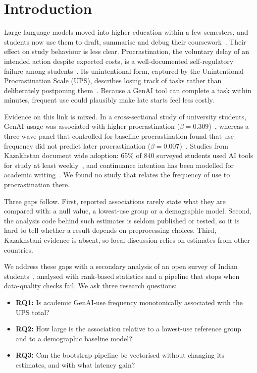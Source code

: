 \section{Introduction}

Large language models moved into higher education within a few semesters, and students now use them to draft, summarise and debug their coursework~\cite{kasneci2023chatgpt}. Their effect on study behaviour is less clear. Procrastination, the voluntary delay of an intended action despite expected costs, is a well-documented self-regulatory failure among students~\cite{steel2007nature}. Its unintentional form, captured by the Unintentional Procrastination Scale (UPS), describes losing track of tasks rather than deliberately postponing them~\cite{fernie2017ups}. Because a GenAI tool can complete a task within minutes, frequent use could plausibly make late starts feel less costly.

Evidence on this link is mixed. In a cross-sectional study of university students, GenAI usage was associated with higher procrastination ($\beta=0.309$)~\cite{abbas2024harmful}, whereas a three-wave panel that controlled for baseline procrastination found that use frequency did not predict later procrastination ($\beta=0.007$)~\cite{zhao2026panel}. Studies from Kazakhstan document wide adoption: 65\% of 840 surveyed students used AI tools for study at least weekly~\cite{askarkyzy2024perceptions}, and continuance intention has been modelled for academic writing~\cite{bekturova2025tefl}. We found no study that relates the frequency of use to procrastination there.

Three gaps follow. First, reported associations rarely state what they are compared with: a null value, a lowest-use group or a demographic model. Second, the analysis code behind such estimates is seldom published or tested, so it is hard to tell whether a result depends on preprocessing choices. Third, Kazakhstani evidence is absent, so local discussion relies on estimates from other countries.

We address these gaps with a secondary analysis of an open survey of Indian students~\cite{sharma2026dataset}, analysed with rank-based statistics and a pipeline that stops when data-quality checks fail. We ask three research questions:
\begin{itemize}
\item \textbf{RQ1:} Is academic GenAI-use frequency monotonically associated with the UPS total?
\item \textbf{RQ2:} How large is the association relative to a lowest-use reference group and to a demographic baseline model?
\item \textbf{RQ3:} Can the bootstrap pipeline be vectorised without changing its estimates, and with what latency gain?
\end{itemize}

